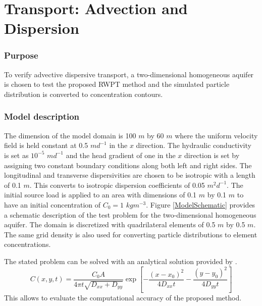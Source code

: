 \section{Transport: Advection and Dispersion}

\subsubsection*{Purpose}
%
To verify advective dispersive transport, a two-dimensional homogeneous aquifer is chosen to test the proposed RWPT method and the simulated particle distribution is converted to concentration contours.

\subsubsection*{Model description}
%
The dimension of the model domain is 100 $m$ by 60 $m$ where the uniform velocity field is held constant at 0.5 $md^{-1}$ in the $x$ direction. The hydraulic conductivity is set as $10^{-5}$ $md^{-1}$ and the head gradient of one in the $x$ direction is set by assigning two constant boundary conditions along both left and right sides. The longitudinal and transverse dispersivities are chosen to be isotropic with a length of 0.1 $m$. This converts to isotropic dispersion coefficients of 0.05 $m^2d^{-1}$. The initial source load is applied to an area with dimensions of 0.1 $m$ by 0.1 $m$ to have an initial concentration of $C _0=1$ $kg m^{-3}$.
Figure \ref{ModelSchematic} provides a schematic description of the test problem for the two-dimensional homogeneous aquifer. The domain is discretized with quadrilateral elements of 0.5 $m$ by 0.5 $m$. The same grid density is also used for converting particle distributions to element concentrations.

The stated problem can be solved with an analytical solution provided by \cite{aO61}.
\begin{equation}\label{ogata}
C\left( {x,y,t} \right) = \frac{{C_0 A}}{{4\pi t\sqrt {D_{xx} + D_{yy} } }}\exp\left[ { - \frac{{\left( {x - x_0 } \right)^2 }}{{4D_{xx} t}} - \frac{{\left( {y - y_0 } \right)^2 }}{{4D_{yy} t}}} \right]
\end{equation}
This allows to evaluate the computational accuracy of the proposed method.

